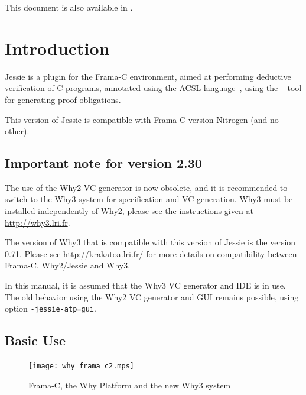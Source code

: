 \documentclass[a4paper,11pt,twoside,openright]{report}
\begin{document}
\ifhevea%
This document is also available in .
\else
\sloppy
{}
\fi


\tableofcontents

\chapter{Introduction}

Jessie is a plugin for the Frama-C environment, aimed at performing
deductive verification of C programs, annotated using the ACSL
language~\cite{baudin09acsl}, using the \Why{}~\cite{why} tool for
generating proof obligations.

This version \whyversion{} of Jessie is compatible with Frama-C version
Nitrogen (and no other).

\section{Important note for version 2.30}

The use of the Why2 VC generator is now obsolete, and it is
recommended to switch to the Why3 system for specification and VC
generation. Why3 must be installed independently of Why2, please see the
instructions given at \url{http://why3.lri.fr}.

The version of Why3 that is compatible with this version \whyversion{} of Jessie
is the version 0.71. Please see \url{http://krakatoa.lri.fr/} for more
details on compatibility between Frama-C, Why2/Jessie and Why3.

In this manual, it is assumed that the Why3 VC generator and IDE is in
use.  The old behavior using the Why2 VC generator and GUI remains
possible, using option \texttt{-jessie-atp=gui}.

\section{Basic Use}

\begin{figure}[t]
  \begin{center}
    \texttt{[image: why\_frama\_c2.mps]}
  \end{center}
  \caption{Frama-C, the Why Platform and the new Why3 system}
  \label{fig:platform}
\hrulefill
\end{figure}
\end{document}
